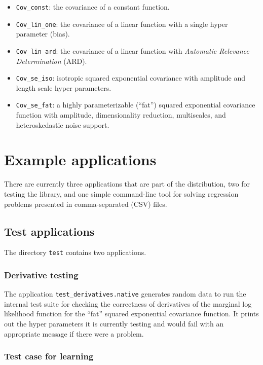 \documentclass[10pt]{report}
\begin{document}
\begin{itemize}
\item \verb=Cov_const=: the covariance of a constant function.
\item \verb=Cov_lin_one=: the covariance of a linear function with a single
hyper parameter (bias).
\item \verb=Cov_lin_ard=: the covariance of a linear function with
\emph{Automatic Relevance Determination} (ARD).
\item \verb=Cov_se_iso=: isotropic squared exponential covariance with amplitude
and length scale hyper parameters.
\item \verb=Cov_se_fat=: a highly parameterizable (``fat'') squared exponential
covariance function with amplitude, dimensionality reduction, multiscales, and
heteroskedastic noise support.
\end{itemize}

\chapter{Example applications}

There are currently three applications that are part of the distribution, two
for testing the library, and one simple command-line tool for solving regression
problems presented in comma-separated (CSV) files.

\section{Test applications}

The directory \verb=test= contains two applications.

\subsection{Derivative testing}

The application \verb=test_derivatives.native= generates random data to
run the internal test suite for checking the correctness of derivatives of
the marginal log likelihood function for the ``fat'' squared exponential
covariance function.  It prints out the hyper parameters it is currently
testing and would fail with an appropriate message if there were a problem.

\subsection{Test case for learning}
\end{document}
